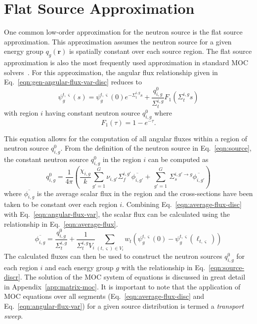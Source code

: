 \section{Flat Source Approximation}
\label{sec:flat-source}

One common low-order approximation for the neutron source is the flat source approximation. This approximation assumes the neutron source for a given energy group $q_g(\mathbf{r})$ is spatially constant over each source region. The flat source approximation is also the most frequently used approximation in standard \ac{MOC} solvers~\cite{dragon_3d_moc, kochunas, apollo3_vv, cactus_3d, liu_mrt, mockingbird, rhodes2006casmo}. For this approximation, the angular flux relationship given in Eq.~\ref{eqn:gen-angular-flux-var-disc} reduces to
\begin{dmath}
	\psi_g^{t,\varsigma}(s) = \psi^{t,\varsigma}_g(0) e^{-\Sigma_{t}^{i,g} s}  + \frac{q^0_{i,g}}{\Sigma_{t}^{i,g}} F_1 \left(\Sigma_{t}^{i,g}s\right)
	\label{eqn:angular-flux-var}
\end{dmath}
with region $i$ having constant neutron source $q^0_{i,g}$ where
\begin{equation}
F_1(\tau) = 1 - e^{-\tau}.
\label{eq:f1}
\end{equation}

This equation allows for the computation of all angular fluxes within a region of neutron source $q^0_{i,g}$. From the definition of the neutron source in Eq.~\ref{eqn:source}, the constant neutron source $q^0_{i,g}$ in the region $i$ can be computed as
\begin{equation}
q^0_{i,g} = \frac{1}{4 \pi} \left( \frac{\chi_{i,g}}{k} \sum_{g'=1}^{G} \nu_{i,g'} \Sigma_f^{i,g'} \overline{\phi_{i,g'}} + \, \sum_{g'=1}^G \,  \Sigma_{s}^{i,g' \rightarrow g} \overline{\phi_{i,g'}} \right)
\label{eqn:source-discr}
\end{equation}
where $\overline{\phi_{i,g}}$ is the average scalar flux in the region and the cross-sections have been taken to be constant over each region $i$. Combining Eq.~\ref{eqn:average-flux-disc} with Eq.~\ref{eqn:angular-flux-var}, the scalar flux can be calculated using the relationship in Eq.~\ref{eqn:average-flux}.
\begin{dmath}
	\overline{\phi_{i,g}} = \frac{q^0_{i,g}}{\Sigma_{t}^{i,g}} + \frac{1}{\Sigma_{t}^{i,g} V_i} \sum_{(t,\varsigma) \in V_i} w_{t} \left( \psi_g^{t,\varsigma}(0) - \psi_g^{t,\varsigma}(\ell_{t,\varsigma}) \right)
	\label{eqn:average-flux}
\end{dmath}
The calculated fluxes can then be used to construct the neutron sources $q^0_{i,g}$ for each region $i$ and each energy group $g$ with the relationship in Eq.~\ref{eqn:source-discr}. The solution of the \ac{MOC} system of equations is discussed in great detail in Appendix~\ref{app:matrix-moc}. It is important to note that the application of \ac{MOC} equations over all segments (Eq.~\ref{eqn:average-flux-disc} and Eq.~\ref{eqn:angular-flux-var}) for a given source distribution is termed a \textit{transport sweep}.


